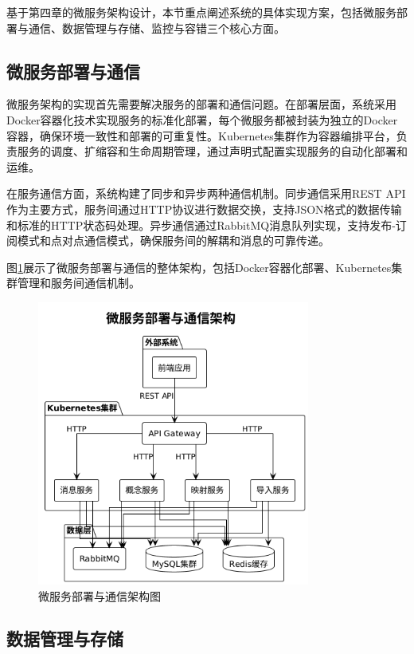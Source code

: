 基于第四章的微服务架构设计，本节重点阐述系统的具体实现方案，包括微服务部署与通信、数据管理与存储、监控与容错三个核心方面。

\subsection{微服务部署与通信}

微服务架构的实现首先需要解决服务的部署和通信问题。在部署层面，系统采用Docker容器化技术实现服务的标准化部署，每个微服务都被封装为独立的Docker容器，确保环境一致性和部署的可重复性。Kubernetes集群作为容器编排平台，负责服务的调度、扩缩容和生命周期管理，通过声明式配置实现服务的自动化部署和运维。

在服务通信方面，系统构建了同步和异步两种通信机制。同步通信采用REST API作为主要方式，服务间通过HTTP协议进行数据交换，支持JSON格式的数据传输和标准的HTTP状态码处理。异步通信通过RabbitMQ消息队列实现，支持发布-订阅模式和点对点通信模式，确保服务间的解耦和消息的可靠传递。

图\ref{fig:microservice_deployment}展示了微服务部署与通信的整体架构，包括Docker容器化部署、Kubernetes集群管理和服务间通信机制。

\begin{figure}[H]
    \centering
    \includegraphics[width=0.8\textwidth]{chapters/fig-0/microservice_deployment.png}
    \caption{微服务部署与通信架构图}
    \label{fig:microservice_deployment}
\end{figure}

\subsection{数据管理与存储}


